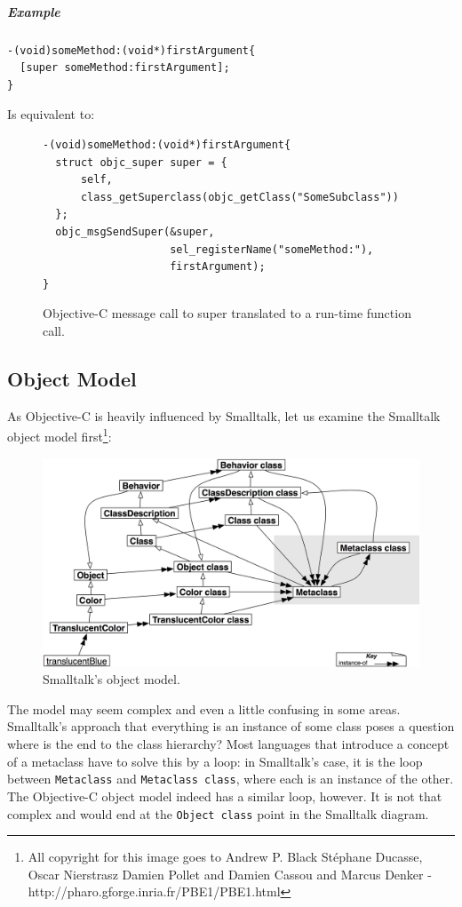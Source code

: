 \subparagraph{Example}

\begin{verbatim}
-(void)someMethod:(void*)firstArgument{
  [super someMethod:firstArgument];
}
\end{verbatim}

Is equivalent to:

\begin{figure}[H]
\begin{verbatim}
-(void)someMethod:(void*)firstArgument{
  struct objc_super super = { 
      self, 
      class_getSuperclass(objc_getClass("SomeSubclass")) 
  };
  objc_msgSendSuper(&super, 
                    sel_registerName("someMethod:"), 
                    firstArgument);
}
\end{verbatim}
\centering{}
  \caption{Objective-C message call to super translated to a run-time function call.}
  \label{fig:methods_translated_to_objcMsgSendSuper}
\end{figure}

\subsection{Object Model}

As Objective-C is heavily influenced by Smalltalk, let us examine the Smalltalk object model first\footnote{All copyright for this image goes to Andrew P. Black St\'{e}phane Ducasse, Oscar Nierstrasz Damien Pollet and Damien Cassou and Marcus Denker - http://pharo.gforge.inria.fr/PBE1/PBE1.html}:

\begin{figure}[H]
\includegraphics[width=120mm]{./img/smalltalk_class_hierarchy.png}
  \centering{}
  \caption{Smalltalk's object model.}
  \label{fig:smalltalk_obj_model}
\end{figure}

The model may seem complex and even a little confusing in some areas. Smalltalk's approach that everything is an instance of some class poses a question where is the end to the class hierarchy? Most languages that introduce a concept of a metaclass have to solve this by a loop: in Smalltalk's case, it is the loop between \verb=Metaclass= and \verb=Metaclass class=, where each is an instance of the other. The Objective-C object model indeed has a similar loop, however. It is not that complex and would end at the \verb=Object class= point in the Smalltalk diagram.

